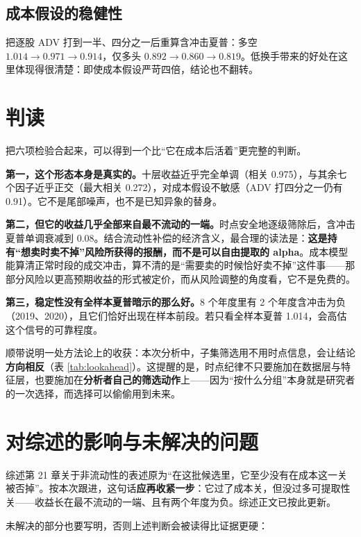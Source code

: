 \documentclass[11pt,a4paper]{ctexart}
\begin{document}
\subsection{成本假设的稳健性}

把逐股 ADV 打到一半、四分之一后重算含冲击夏普：多空 $1.014 \to 0.971 \to 0.914$，仅多头 $0.892 \to 0.860 \to 0.819$。低换手带来的好处在这里体现得很清楚：即使成本假设严苛四倍，结论也不翻转。

\section{判读}

把六项检验合起来，可以得到一个比“它在成本后活着”更完整的判断。

\textbf{第一，这个形态本身是真实的。}十层收益近乎完全单调（相关 0.975），与其余七个因子近乎正交（最大相关 0.272），对成本假设不敏感（ADV 打四分之一仍有 0.91）。它不是尾部噪声，也不是已知异象的替身。

\textbf{第二，但它的收益几乎全部来自最不流动的一端。}时点安全地逐级筛除后，含冲击夏普单调衰减到 0.08。结合流动性补偿的经济含义，最合理的读法是：\textbf{这是持有“想卖时卖不掉”风险所获得的报酬，而不是可以自由提取的 alpha}。成本模型能算清正常时段的成交冲击，算不清的是“需要卖的时候恰好卖不掉”这件事——那部分风险以更高预期收益的形式被定价，而从风险调整的角度看，它不是免费的。

\textbf{第三，稳定性没有全样本夏普暗示的那么好。}8 个年度里有 2 个年度含冲击为负（2019、2020），且它们恰好出现在样本前段。若只看全样本夏普 1.014，会高估这个信号的可靠程度。

顺带说明一处方法论上的收获：本次分析中，子集筛选用不用时点信息，会让结论\textbf{方向相反}（表 \ref{tab:lookahead}）。这提醒的是，时点纪律不只要施加在数据层与特征层，也要施加在\textbf{分析者自己的筛选动作}上——因为“按什么分组”本身就是研究者的一次选择，而选择可以偷偷用到未来。

\section{对综述的影响与未解决的问题}

综述第 21 章关于非流动性的表述原为“在这批候选里，它至少没有在成本这一关被否掉”。按本次跟进，这句话\textbf{应再收紧一步}：它过了成本关，但没过多可提取性关——收益长在最不流动的一端、且有两个年度为负。综述正文已按此更新。

未解决的部分也要写明，否则上述判断会被读得比证据更硬：
\end{document}
